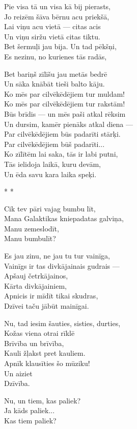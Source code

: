 \documentclass[14pt]{extarticle}
\begin{document}
Pie visa tā un visa kā bij pierasts,\\
Jo reizēm šāva bērnu acu priekšā,\\
Lai viņu acu vietā --- citas acis\\
Un viņu siržu vietā citas tiktu.\\
Bet šermuļi jau bija. Un tad pēkšņi,\\
Es nezinu, no kurienes tās radās,

Bet bariņš zīlīšu jau metās bedrē\\
Un sāka knābāt tieši balto kāju.\\
Ko mēs par cilvēkēdējiem tur muldam!\\
Ko mēs par cilvēkēdējiem tur rakstām!\\
Būs brīdis --- un mēs paši atkal rēksim\\
Un dursim, kamēr pienāks atkal diena ---\\
Par cilvēkēdējiem būs padarīti stārķi.\\
Par cilvēkēdējiem būš padarīti...\\
Ko zīlītēm lai saka, tās ir labi putni,\\
Tās ielidoja laikā, kuru devām,\\
Un ēda savu kara laika speķi.


\newpage

{\large \sc * * *}

Cik tev pāri vajag bumbu līt,\\
Mana Galaktikas kniepadatas galviņa,\\
Manu zemeslodīt,\\
Manu bumbulīt?

Es jau zinu, ne jau tu tur vainīga,\\
Vainīgs ir tas divkājainais gudrais ---\\
Apšauj četrkājainos,\\
Kārta divkājainiem,\\
Apnicis ir mīdīt tikai skudras,\\
Dzīvei taču jābūt mainīgai.

Nu, tad iesim šauties, sisties, durties,\\
Kožas viena otrai rīklē\\
Brīvība un brīvība,\\
Kauli žļakst pret kauliem.\\
Apnīk klausīties šo mūziku!\\
Un aiziet\\
Dzīvība.

Nu, un tiem, kas paliek?\\
Ja kāds paliek...\\
Kas tiem paliek?
\end{document}
